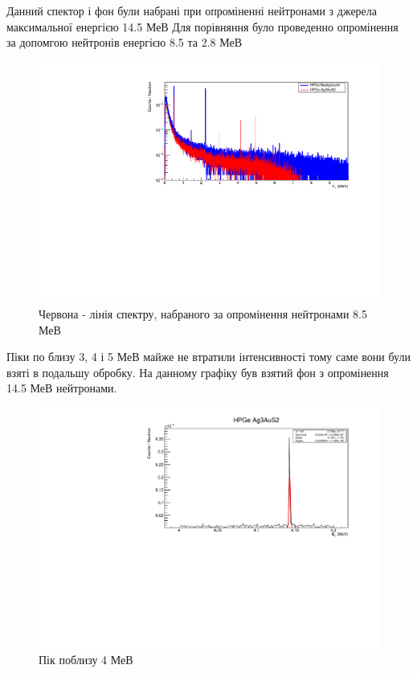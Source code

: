 \documentclass[a4paper, 14pt]{article}
\numberwithin{equation}{section}
\numberwithin{table}{section}
\begin{document}
	Данний спектор і фон були набрані при опроміненні нейтронами з джерела максимальної енергією 14.5 МеВ
	Для порівняння було проведенно опромінення за допомгою нейтронів енергією 8.5 та 2.8 МеВ
	\begin{figure}[hbt!]
		\centering \includegraphics[width=1\textwidth]{res/Ag3AuS2_8_5MeVFonClasic.pdf}
		\caption{Червона - лінія спектру, набраного за опромінення нейтронами 8.5 МеВ}
		\label{ris:Ag3AuS28_5MeV}	
	\end{figure} 
	
	Піки по близу 3, 4 і 5 МеВ майже не втратили інтенсивності тому саме вони були взяті в подальшу обробку. На данному графіку був взятий фон з опромінення 14.5 МеВ нейтронами.
	
	\begin{figure}[hbt!]
		\centering \includegraphics[width=1\textwidth]{res/fit/Ag3AuS24143.pdf}
		\caption{Пік поблизу 4 МеВ}
		\label{ris:Ag3AuS24143}	
	\end{figure} 
\end{document}
